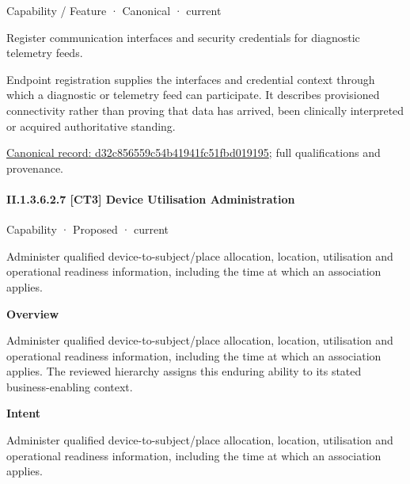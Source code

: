\label{element:d32c856559c54b41941fc51fbd019195}
{\small Capability / Feature · Canonical · current}\par

Register communication interfaces and security credentials for diagnostic telemetry feeds.



Endpoint registration supplies the interfaces and credential context through which a diagnostic or telemetry feed can participate. It describes provisioned connectivity rather than proving that data has arrived, been clinically interpreted or acquired authoritative standing.


{\footnotesize \href{../../../../continuum/strategy/capability/feature/d32c856559c54b41941fc51fbd019195.md}{Canonical record: d32c856559c54b41941fc51fbd019195}; full qualifications and provenance.}\par
\paragraph*{II.1.3.6.2.7 [CT3] Device Utilisation Administration}
\label{navigation:II.1.3.6.2.7}

\label{element:1a3732b5911c45b3aece38b2db2d0f15}
{\small Capability · Proposed · current}\par

Administer qualified device-to-subject/place allocation, location, utilisation and operational readiness information, including the time at which an association applies.



\textbf{Overview}



Administer qualified device-to-subject/place allocation, location, utilisation and operational readiness information, including the time at which an association applies. The reviewed hierarchy assigns this enduring ability to its stated business-enabling context.



\textbf{Intent}



Administer qualified device-to-subject/place allocation, location, utilisation and operational readiness information, including the time at which an association applies.



